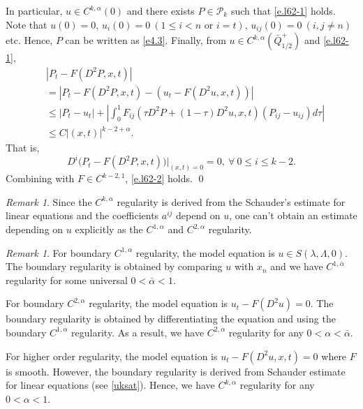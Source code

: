 \documentclass[preprint,12pt]{elsarticle}
\theoremstyle{definition}
\theoremstyle{remark}
\newtheorem{remark}[theorem]{Remark}
\numberwithin{equation}{section}
\begin{document}
In particular, $u\in C^{k,\alpha}(0)$ and there exists $P\in \mathcal{P}_k$ such that \cref{e.l62-1} holds. Note that $u(0)=0$, $u_i(0)=0~(1\leq i<n \text{ or } i=t)$, $u_{ij}(0)=0 ~(i,j\neq n)$ etc. Hence, $P$ can be written as \cref{e4.3}. Finally, from $u\in C^{k,\alpha}(\bar{Q}^+_{1/2})$ and \cref{e.l62-1},
\begin{equation*}
  \begin{aligned}
    &|P_t-F(D^2P,x,t)|\\
    &=|P_t-F(D^2P,x,t)-\left(u_t-F(D^2u,x,t)\right)|\\
    &\leq \left|P_t-u_t\right|+\left|\int_{0}^{1} F_{ij}(\tau D^2P+(1-\tau) D^2u,x,t)
    \left(P_{ij}-u_{ij}\right)d\tau \right|\\
    &\leq C |(x,t)|^{k-2+\alpha}.
  \end{aligned}
\end{equation*}
That is,
\begin{equation*}
  D^{i} \Big(P_t-F(D^2P,x,t)\Big)\Big|_{(x,t)=0}=0,~\forall ~0\leq i\leq k-2.
\end{equation*}
Combining with $F\in C^{k-2,1}$, \cref{e.l62-2} holds. \qed~\\

\begin{remark}\label{re4.2}
Since the $C^{k,\alpha}$ regularity is derived from the Schauder's estimate for linear equations and the coefficients $a^{ij}$ depend on $u$, one can't obtain an estimate depending on $u$ explicitly as the
$C^{1,\alpha}$ and $C^{2,\alpha}$ regularity.
\end{remark}

\begin{remark}\label{re4.1}
For boundary $C^{1,\alpha}$ regularity, the model equation is $u\in S(\lambda,\Lambda,0)$. The boundary regularity is obtained by comparing $u$ with $x_n$ and we have $C^{1,\bar{\alpha}}$ regularity for some universal $0<\bar{\alpha}<1$.

For boundary $C^{2,\alpha}$ regularity, the model equation is $u_t-F(D^2u)=0$. The boundary regularity is obtained by differentiating the equation and using the boundary $C^{1,\alpha}$ regularity. As a result, we have $C^{2,\alpha}$ regularity for any $0<\alpha<\bar{\alpha}$.

For higher order regularity, the model equation is $u_t-F(D^2u,x,t)=0$ where $F$ is smooth. However, the boundary regularity is derived from Schauder estimate for linear equations (see \cref{uksat}). Hence, we have $C^{k,\alpha}$ regularity for any $0<\alpha<1$.
\end{remark}
~\\
\end{document}
